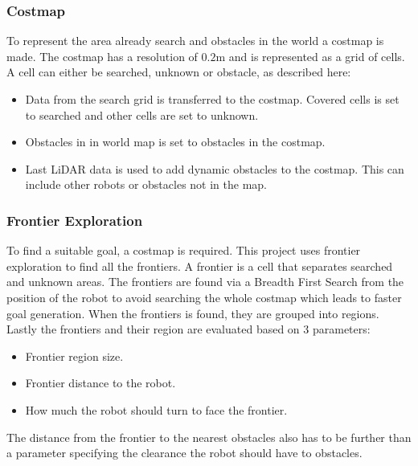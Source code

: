 \subsubsection{Costmap}\label{sec:costmap}
To represent the area already search and obstacles in the world a costmap is made. 
The costmap has a resolution of $0.2$m and is represented as a grid of cells. A cell can either be searched, unknown or obstacle, as described here:
\begin{itemize}
  \item Data from the search grid is transferred to the costmap. Covered cells is set to searched and other cells are set to unknown.
  \item Obstacles in in world map is set to obstacles in the costmap.
  \item Last LiDAR data is used to add dynamic obstacles to the costmap. This can include other robots or obstacles not in the map.
\end{itemize}

\subsubsection{Frontier Exploration}\label{sec:frontier_exploration}
To find a suitable goal, a costmap is required.
This project uses frontier exploration to find all the frontiers. 
A frontier is a cell that separates searched and unknown areas. 
The frontiers are found via a Breadth First Search from the position of the robot  to avoid searching the whole costmap which leads to faster goal generation. When the frontiers is found, they are grouped into regions. 
Lastly the frontiers and their region are evaluated based on 3 parameters:
\begin{itemize}
  \item Frontier region size.
  \item Frontier distance to the robot.
  \item How much the robot should turn to face the frontier.
\end{itemize}
The distance from the frontier to the nearest obstacles also has to be further than a parameter specifying the clearance the robot should have to obstacles.



